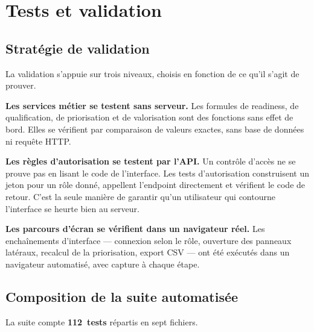 \chapter{Tests et validation}
\label{chap:tests}

\section{Stratégie de validation}

La validation s'appuie sur trois niveaux, choisis en fonction de ce qu'il s'agit de
prouver.

\textbf{Les services métier se testent sans serveur.} Les formules de readiness, de
qualification, de priorisation et de valorisation sont des fonctions sans effet de bord.
Elles se vérifient par comparaison de valeurs exactes, sans base de données ni requête
HTTP.

\textbf{Les règles d'autorisation se testent par l'API.} Un contrôle d'accès ne se
prouve pas en lisant le code de l'interface. Les tests d'autorisation construisent un
jeton pour un rôle donné, appellent l'endpoint directement et vérifient le code de
retour. C'est la seule manière de garantir qu'un utilisateur qui contourne l'interface
se heurte bien au serveur.

\textbf{Les parcours d'écran se vérifient dans un navigateur réel.} Les enchaînements
d'interface — connexion selon le rôle, ouverture des panneaux latéraux, recalcul de la
priorisation, export CSV — ont été exécutés dans un navigateur automatisé, avec capture
à chaque étape.

\section{Composition de la suite automatisée}

La suite compte \textbf{112~tests} répartis en sept fichiers.

